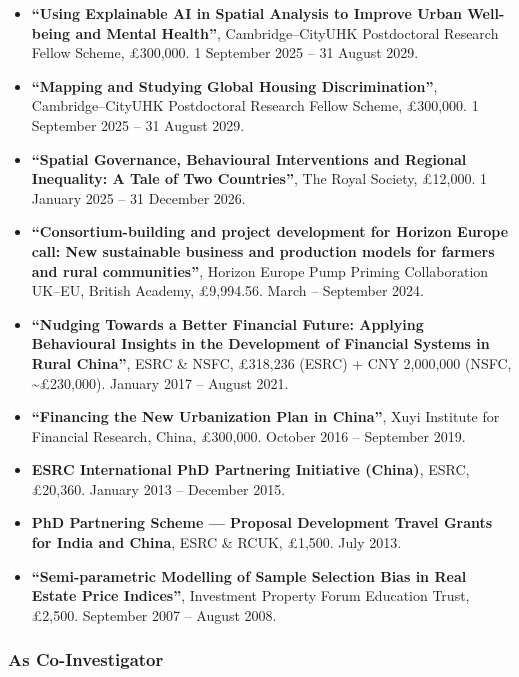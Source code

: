 \documentclass[11pt,a4paper]{article}
\providecommand{\tightlist}{%
  \setlength{\itemsep}{1pt}\setlength{\parskip}{0pt}}
\begin{document}
\begin{itemize}
\tightlist
\item
  \textbf{``Using Explainable AI in Spatial Analysis to Improve Urban
  Well-being and Mental Health''}, Cambridge--CityUHK Postdoctoral
  Research Fellow Scheme, £300,000. 1 September 2025 -- 31 August 2029.
\item
  \textbf{``Mapping and Studying Global Housing Discrimination''},
  Cambridge--CityUHK Postdoctoral Research Fellow Scheme, £300,000. 1
  September 2025 -- 31 August 2029.
\item
  \textbf{``Spatial Governance, Behavioural Interventions and Regional
  Inequality: A Tale of Two Countries''}, The Royal Society, £12,000. 1
  January 2025 -- 31 December 2026.
\item
  \textbf{``Consortium-building and project development for Horizon
  Europe call: New sustainable business and production models for
  farmers and rural communities''}, Horizon Europe Pump Priming
  Collaboration UK--EU, British Academy, £9,994.56. March -- September
  2024.
\item
  \textbf{``Nudging Towards a Better Financial Future: Applying
  Behavioural Insights in the Development of Financial Systems in Rural
  China''}, ESRC \& NSFC, £318,236 (ESRC) + CNY 2,000,000 (NSFC,
  \textasciitilde£230,000). January 2017 -- August 2021.
\item
  \textbf{``Financing the New Urbanization Plan in China''}, Xuyi
  Institute for Financial Research, China, £300,000. October 2016 --
  September 2019.
\item
  \textbf{ESRC International PhD Partnering Initiative (China)}, ESRC,
  £20,360. January 2013 -- December 2015.
\item
  \textbf{PhD Partnering Scheme --- Proposal Development Travel Grants
  for India and China}, ESRC \& RCUK, £1,500. July 2013.
\item
  \textbf{``Semi-parametric Modelling of Sample Selection Bias in Real
  Estate Price Indices''}, Investment Property Forum Education Trust,
  £2,500. September 2007 -- August 2008.
\end{itemize}

\subsubsection{As Co-Investigator}\label{as-co-investigator}
\end{document}
